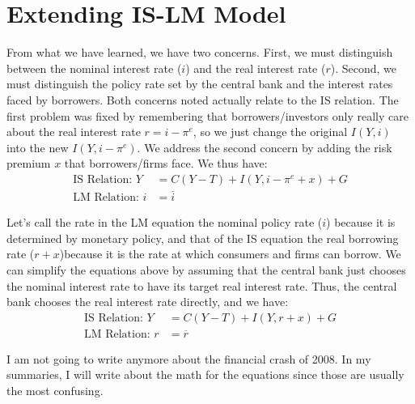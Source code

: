 \documentclass{extarticle}
\begin{document}
\section{Extending IS-LM Model}
From what we have learned, we have two concerns. First, we must distinguish between the nominal interest rate ($i$) and the real interest rate ($r$). Second, we must distinguish the policy rate set by the central bank and the interest rates faced by borrowers.
Both concerns noted actually relate to the IS relation. The first problem was fixed by remembering that borrowers/investors only really care about the real interest rate $r = i - \pi^e$, so we just change the original $I(Y, i)$ into the new $I(Y, i - \pi^e)$. We address the second concern by adding the risk premium $x$ that borrowers/firms face. We thus have:
\begin{align*}
  \text{IS Relation: } Y &= C(Y-T) + I(Y, i - \pi^e + x) + G \\
  \text{LM Relation: } i &= \overline{i}
\end{align*}

Let’s call the rate in the LM equation the nominal policy rate ($i$) because it is determined by monetary policy, and that of the IS equation the real borrowing rate ($r+x$)because it is the rate at which consumers and firms can borrow. We can simplify the equations above by assuming that the central bank just chooses the nominal interest rate to have its target real interest rate. Thus, the central bank chooses the real interest rate directly, and we have:
\begin{align*}
  \text{IS Relation: } Y &= C(Y-T) + I(Y, r + x) + G \\
  \text{LM Relation: } r &= \overline{r}
\end{align*}

I am not going to write anymore about the financial crash of 2008. In my summaries, I will write about the math for the equations since those are usually the most confusing.
\end{document}
